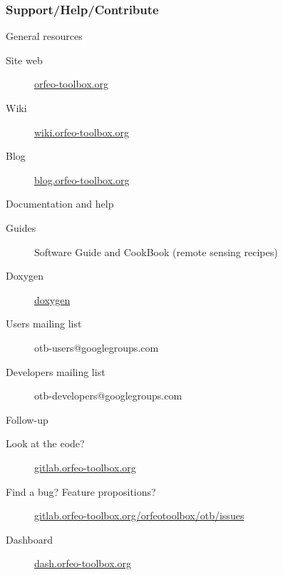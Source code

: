 \documentclass[8pt]{beamer}
\begin{document}
\begin{frame}
\frametitle{Support/Help/Contribute}
\vspace{-0.2cm}
\begin{block}{General resources}
\vspace{-0.2cm}
\begin{description}
\item[Site web] \href{http://www.orfeo-toolbox.org}{orfeo-toolbox.org}
\item[Wiki] \href{http://wiki.orfeo-toolbox.org}{wiki.orfeo-toolbox.org}
\item[Blog] \href{http://blog.orfeo-toolbox.org}{blog.orfeo-toolbox.org}
\end{description}
\end{block}
\vspace{-0.2cm}
\begin{block}{Documentation and help}
\vspace{-0.2cm}
\begin{description}
\item[Guides] Software Guide and CookBook (remote sensing recipes)
\item[Doxygen] \href{http://www.orfeo-toolbox.org/doxygen}{doxygen}
\item[Users mailing list] otb-users@googlegroups.com
\item[Developers mailing list] otb-developers@googlegroups.com
\end{description}
\end{block}
\vspace{-0.2cm}
\begin{block}{Follow-up}
\vspace{-0.2cm}
\begin{description}
\item[Look at the code?] \href{https://gitlab.orfeo-toolbox.org/orfeotoolbox/otb}{gitlab.orfeo-toolbox.org}
\item[Find a bug? Feature propositions?] \href{https://gitlab.orfeo-toolbox.org/orfeotoolbox/otb/issues}{gitlab.orfeo-toolbox.org/orfeotoolbox/otb/issues}
\item[Dashboard] \href{http://dash.orfeo-toolbox.org}{dash.orfeo-toolbox.org}
\end{description}
\end{block}
\end{frame}
\end{document}
